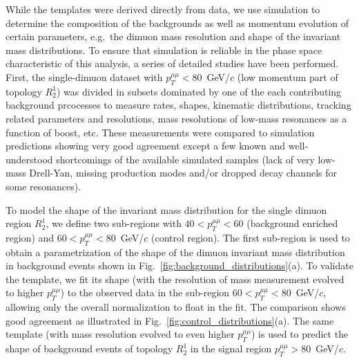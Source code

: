 While the templates were derived directly from data, we use simulation to determine the composition of the backgrounds as well as momentum evolution of certain parameters, e.g.\ the dimuon mass resolution and shape of the invariant mass distributions. To ensure 
that simulation is reliable in the phase space characteristic of this analysis, a series of detailed studies have been performed. First, the single-dimuon dataset with $p_T^{\mu \mu}<80$~GeV/$c$ (low momentum part of topology $R^1_2$) was divided in subsets dominated by one of the each contributing background prcocesses to measure rates, shapes, kinematic distributions, tracking related parameters and resolutions, mass resolutions of low-mass resonances as a function of boost, etc. These measurements were compared to simulation predictions showing very good agreement except a few known and well-understood shortcomings of the available simulated samples (lack of very low-mass Drell-Yan, missing production modes and/or dropped decay channels for some resonances).

To model the shape of the invariant mass distribution for the single dimuon region $R^1_2$, we define two sub-regions with $40<p_T^{\mu \mu}<60$ (background enriched region) and $60<p_T^{\mu \mu}<80$~GeV/$c$ (control region). The first sub-region is used to obtain a parametrization of the shape of the dimuon invariant mass distribution in background events shown in Fig.~\ref{fig:background_distributions}(a). To validate the template, we fit its shape (with the resolution of mass measurement evolved to higher $p_T^{\mu\mu}$) to the observed data in the sub-region $60<p_T^{\mu \mu}<80$~GeV/$c$, allowing only the overall normalization to float in the fit. The comparison shows good agreement as illustrated in Fig.~\ref{fig:control_distributions}(a). The same template (with mass resolution evolved to even higher $p_T^{\mu\mu}$) is used to predict the shape of background events of topology $R^1_2$ in the signal region $p_T^{\mu\mu}>80$~GeV/$c$.

